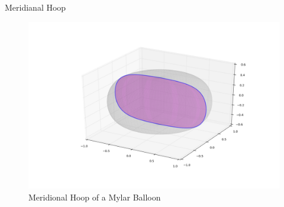 \documentclass{beamer}
\begin{document}
\begin{frame}{Meridianal Hoop}

  \begin{figure}[!ht]
    \centering
    \includegraphics[width=1\textwidth]{mylar_balloon_meridianal_hoop.png}
    \caption{Meridional Hoop of a Mylar Balloon }
  \end{figure}

\end{frame}
\end{document}
